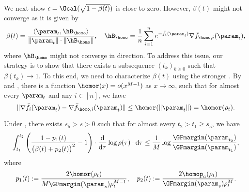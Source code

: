 
We next show $\epsilon = \Ocal(\sqrt{1-\beta(t)})$ is close to zero. 
However, $\beta(t)$ might not converge as it is given by
\[
    \beta(t) = \frac{\langle \param_t , \hB_{\homo} \rangle }{\| \param_t \|\cdot \|\hB_{\homo}\|}, \quad \hB_{\homo} = \frac{1}{n} \sum_{i=1}^n e^{- \bar f_{i}(\param_t)}\nabla \bar f_{\homo,i}(\param_t),
\]
where 
$\hB_{\homo}$ might not converge in direction.
To address this issue,
our strategy is to show that there exists a subsequence $(t_k)_{k\ge 0}$ such that $\beta(t_k) \to 1$. 
To this end, we need to characterize $\beta(t)$ using the stronger .
By  and , there is a function $\homor(x) = o(x^{M-1})$ as $x \to \infty$, such that for almost every $\param_t$ and any $i\in [n]$, we have
\[
    \| \nabla \bar f_{i}(\param_t) - \nabla \bar f_{\homo,i}(\param_t)\| \le \homor(\|\param_t\|) = \homor(\rho_t) .
\]

\begin{lemma}
\label{lem: Characterization of beta}
Under 
, there exists $s_5>s>0$ such that for almost every $t_2>t_1\ge s_5$, we have 
\[
    \int_{t_1}^{t_2}  \Bigg( \frac{1 - p_1(t)}{\big(\beta(t) + p_2(t) \big)^2}-1\Bigg) \cdot \frac{\mathrm{d} }{\mathrm{d} \tau} \log \rho(\tau) \cdot \mathrm{d} \tau \le  \frac{1}{M} \log \frac{\GFmargin(\param_{t_2})}{\GFmargin(\param_{t_1})}, 
\]
where 
\[
    p_1(t) := \frac{2 \homor(\rho_t)}{ M\GFmargin(\param_s) \rho^{M-1}_t}, \quad p_2(t) := \frac{2 \homop_a(\rho_t)}{\GFmargin(\param_s) \rho^{M}_t}.
\]
\end{lemma}

